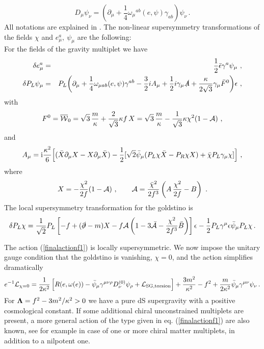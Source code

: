 \documentclass[11pt]{article}
\newcommand{\be}{\begin{equation}}
\newcommand{\ee}{\end{equation}}
\newcommand{\rf}[1]{(\ref{#1})}
\newcommand{\ft}[2]{{\frac{#1}{#2}}}
\def\be{\begin{equation}}
\def\ee{\end{equation}}
\def\rmi{{\rm i}}
\begin{document}
\begin{equation}
  D_\mu \psi _\nu=\left(\partial _\mu +\ft14 \omega _\mu {}^{ab}(e,\psi )\gamma _{ab}\right) \psi _\nu\,.
 \label{Dmupsinu}
\end{equation}
 All notations are explained in  \cite{Bergshoeff:2015tra}. 
The non-linear supersymmetry transformations of the fields $\chi$ and $e^a_\mu,~\psi_\mu$ are  the following: \\
For the fields of the gravity multiplet we
have
\begin{eqnarray}\label{delte}
\delta e^a_\mu &=& \frac12 \bar\epsilon \gamma^a\psi_\mu \ ,\\
\delta P_L\psi_\mu &=& P_L\bigg(\partial_\mu +\frac14 \omega_{\mu ab}(e,\psi)\gamma^{ab}-\frac32iA_\mu +\frac12i\gamma_\mu \slashed{A} +
\frac{\kappa}{2\sqrt3}\gamma_\mu \bar F^0 \bigg)\epsilon\label{deltpsi}\ ,
\end{eqnarray}
with
\begin{equation} %
  F^0=\overline{{\cal W}}_0= \sqrt{3}\,\frac{m}{\kappa}  +\frac{2}{\sqrt{3}} \kappa f\, X= \sqrt{3}\,\frac{m}{\kappa}- \frac{1}{\sqrt{3}}\kappa \chi ^2(1-{\cal A})\ ,
 \label{Fvalue}
\end{equation}
and
\begin{eqnarray}
A_\mu= \rmi\frac{\kappa^2}{6}\Big [ (\bar X\partial _\mu X -X\partial _\mu \bar X )  -\frac{1}{2}[\sqrt{2}\bar \psi _\mu(P_L\chi \bar X -P_R  \chi  X) +\bar \chi P_L\gamma_\mu \chi ]\Big ] \ ,
 \label{Amu}\end{eqnarray}
where
\be
X= - \frac{\chi^2}{ 2 f} (1-{\cal A}) \ , \qquad 
    {\cal A}= \frac{\bar \chi^2}{ 2 f^3} \left(A\, \frac{\chi^2}{2f} - B\right) \ .
 \label{calA}   \ee
The local supersymmetry transformation  for the goldstino is
\begin{equation}
 \delta P_L\chi =\frac1{\sqrt{2}} P_L\left[-f+(\slashed{\partial }-m)X
-  f {\cal A} \left(1-3\bar{{\cal A}}-\frac{\chi^2}{2f ^3}\bar B\right) \right]\epsilon
-\frac{1}{2}P_L\gamma ^\mu \epsilon \bar \psi _\mu P_L\chi
\,.
\label{deltgold}
\end{equation}

The action (\ref{finalactionf1}) is locally supersymmetric.   We now impose the unitary gauge condition that the goldstino is vanishing, $\chi=0$, and the action simplifies dramatically
\begin{equation}
 e^{-1}   {\cal L}_{\chi=0}
=\frac{1}{2\kappa ^2} \left[ R(e,\omega(e )) -\bar \psi _\mu \gamma ^{\mu \nu \rho } D^{(0)}_\nu \psi _\rho
 +{\cal L}_{\rm SG,torsion} \right] +\frac{3m^2}{\kappa^2} -f^2 +\frac{m}{2\kappa^2}\bar \psi _{\mu } \gamma ^{\mu \nu }\psi _{\nu }\,.
 \label{finalactionfFixed}
\end{equation}
For ${\bf  \Lambda} = f^2- 3m^2/\kappa^2 >0$ we have  a pure dS supergravity with a positive cosmological constant.
If some additional chiral unconstrained multiplets are present, a more general action of the type given in eq. \rf{finalactionf1} are also known, see for example \cite{Hasegawa:2015bza, Kallosh:2015tea, Schillo:2015ssx} in case of one or more chiral matter multiplets, in addition to a nilpotent one.
\end{document}
